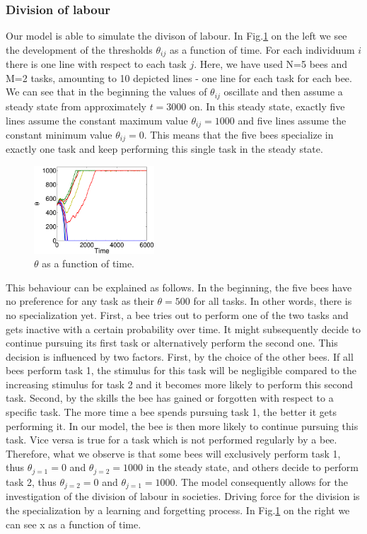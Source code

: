 
\subsubsection*{Division of labour}
Our model is able to simulate the divison of labour. In Fig.\ref{fig:thetax} on the left we see the development of the thresholds $\theta_{ij}$ as a function of time. For each individuum $i$ there is one line with respect to each task $j$. Here, we have used N=5 bees and M=2 tasks, amounting to 10 depicted lines - one line for each task for each bee. We can see that in the beginning the values of $\theta_{ij}$ oscillate and then assume a steady state from approximately $t=3000$ on. In this steady state, exactly five lines assume the constant maximum value $\theta_{ij}=1000$ and five lines assume the constant minimum value $\theta_{ij}=0$. This means that the five bees specialize in exactly one task and keep performing this single task in the steady state.

\begin{figure}[ht!]
	\centering
	\includegraphics[width=0.4\textwidth]{../figures/thetax.eps}
	\caption{$\theta$ as a function of time.}
	\label{fig:thetax}
\end{figure}

This behaviour can be explained as follows. In the beginning, the five bees have no preference for any task as their $\theta=500$ for all tasks. In other words, there is no specialization yet. First, a bee tries out to perform one of the two tasks and gets inactive with a certain probability over time. It might subsequently decide to continue pursuing its first task or alternatively perform the second one. This decision is influenced by two factors. First, by the choice of the other bees. If all bees perform task 1, the stimulus for this task will be negligible compared to the increasing stimulus for task 2 and it becomes more likely to perform this second task. Second, by the skills the bee has gained or forgotten with respect to a specific task. The more time a bee spends pursuing task 1, the better it gets performing it. In our model, the bee is then more likely to continue pursuing this task. Vice versa is true for a task which is not performed regularly by a bee. Therefore, what we observe is that some bees will exclusively perform task 1, thus $\theta_{j=1}=0$ and $\theta_{j=2}=1000$ in the steady state, and others decide to perform task 2, thus $\theta_{j=2}=0$ and $\theta_{j=1}=1000$. The model consequently allows for the investigation of the division of labour in societies. Driving force for the division is the specialization by a learning and forgetting process.
In Fig.\ref{fig:thetax}  on the right we can see x as a function of time.

